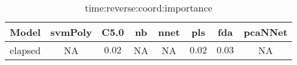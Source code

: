\begin{table}[!ht]
	\centering
	\begin{tabular}{|c|c|c|c|c|c|c|c|}
		\hline
		Model & svmPoly & C5.0 & nb & nnet & pls & fda & pcaNNet \\ \hline
		elapsed & NA & $0.02$ & NA & NA & $0.02$ & $0.03$ & NA \\ \hline
	\end{tabular}
	\caption{time:reverse:coord:importance}
	\label{tab:time:reverse:coord:importance}
\end{table}
